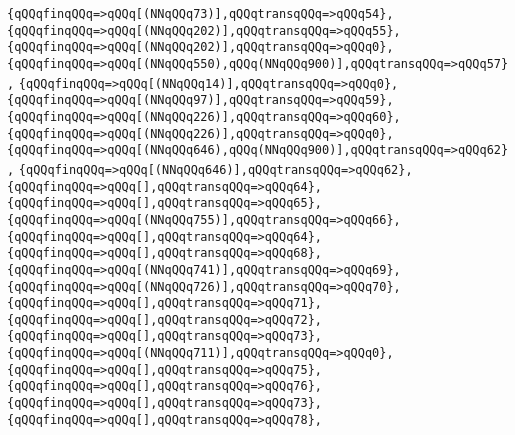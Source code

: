 \verb|{qQQqfinqQQq=>qQQq[(NNqQQq73)],qQQqtransqQQq=>qQQq54},|\newline
\verb|{qQQqfinqQQq=>qQQq[(NNqQQq202)],qQQqtransqQQq=>qQQq55},|\newline
\verb|{qQQqfinqQQq=>qQQq[(NNqQQq202)],qQQqtransqQQq=>qQQq0},|\newline
\verb|{qQQqfinqQQq=>qQQq[(NNqQQq550),qQQq(NNqQQq900)],qQQqtransqQQq=>qQQq57},|\newline
\verb|{qQQqfinqQQq=>qQQq[(NNqQQq14)],qQQqtransqQQq=>qQQq0},|\newline
\verb|{qQQqfinqQQq=>qQQq[(NNqQQq97)],qQQqtransqQQq=>qQQq59},|\newline
\verb|{qQQqfinqQQq=>qQQq[(NNqQQq226)],qQQqtransqQQq=>qQQq60},|\newline
\verb|{qQQqfinqQQq=>qQQq[(NNqQQq226)],qQQqtransqQQq=>qQQq0},|\newline
\verb|{qQQqfinqQQq=>qQQq[(NNqQQq646),qQQq(NNqQQq900)],qQQqtransqQQq=>qQQq62},|\newline
\verb|{qQQqfinqQQq=>qQQq[(NNqQQq646)],qQQqtransqQQq=>qQQq62},|\newline
\verb|{qQQqfinqQQq=>qQQq[],qQQqtransqQQq=>qQQq64},|\newline
\verb|{qQQqfinqQQq=>qQQq[],qQQqtransqQQq=>qQQq65},|\newline
\verb|{qQQqfinqQQq=>qQQq[(NNqQQq755)],qQQqtransqQQq=>qQQq66},|\newline
\verb|{qQQqfinqQQq=>qQQq[],qQQqtransqQQq=>qQQq64},|\newline
\verb|{qQQqfinqQQq=>qQQq[],qQQqtransqQQq=>qQQq68},|\newline
\verb|{qQQqfinqQQq=>qQQq[(NNqQQq741)],qQQqtransqQQq=>qQQq69},|\newline
\verb|{qQQqfinqQQq=>qQQq[(NNqQQq726)],qQQqtransqQQq=>qQQq70},|\newline
\verb|{qQQqfinqQQq=>qQQq[],qQQqtransqQQq=>qQQq71},|\newline
\verb|{qQQqfinqQQq=>qQQq[],qQQqtransqQQq=>qQQq72},|\newline
\verb|{qQQqfinqQQq=>qQQq[],qQQqtransqQQq=>qQQq73},|\newline
\verb|{qQQqfinqQQq=>qQQq[(NNqQQq711)],qQQqtransqQQq=>qQQq0},|\newline
\verb|{qQQqfinqQQq=>qQQq[],qQQqtransqQQq=>qQQq75},|\newline
\verb|{qQQqfinqQQq=>qQQq[],qQQqtransqQQq=>qQQq76},|\newline
\verb|{qQQqfinqQQq=>qQQq[],qQQqtransqQQq=>qQQq73},|\newline
\verb|{qQQqfinqQQq=>qQQq[],qQQqtransqQQq=>qQQq78},|\newline

